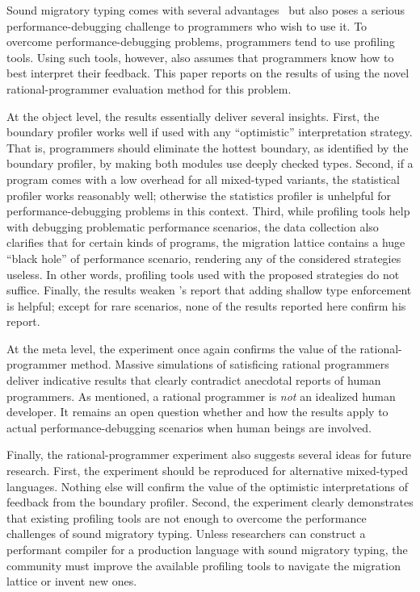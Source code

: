 

Sound migratory typing comes with several advantages~\cite{lgfd-icfp-2021,
lgfd-icfp-2023} but also poses a serious performance-debugging challenge to
programmers who wish to use it. To overcome performance-debugging problems,
programmers tend to use profiling tools. Using such tools, however, also assumes
that programmers know how to best interpret their feedback. This paper reports
on the results of using the novel rational-programmer evaluation method for this
problem.

At the object level, the results essentially deliver several insights. First,
the boundary profiler works well if used with any ``optimistic''
interpretation strategy. That is, programmers should eliminate the hottest
boundary, as identified by the boundary profiler, by making both modules
use deeply checked types. Second, if a program comes with a low overhead for all
mixed-typed variants, the statistical profiler works reasonably well;
otherwise the statistics profiler is unhelpful for performance-debugging
problems in this context. Third, while profiling tools help with debugging
problematic performance scenarios, the data collection also clarifies that for
certain kinds of programs, the migration lattice contains a huge ``black hole''
of performance scenario, rendering any of the considered strategies
useless. In other words, profiling tools used with the proposed strategies do
not suffice. Finally, the results weaken \citet{g-deep-shallow}'s report that
adding shallow type enforcement is helpful; except for rare scenarios, none of
the results reported here confirm his report.

At the meta level, the experiment once again confirms the value of the
rational-programmer method. Massive simulations of satisficing rational
programmers deliver indicative results that clearly contradict anecdotal reports
of human programmers. As mentioned, a rational programmer is {\em not\/} an
idealized human developer. It remains an open question whether and how the
results apply to actual performance-debugging scenarios when human beings are
involved.

Finally, the rational-programmer experiment also suggests several ideas for
future research. First, the experiment should be reproduced for alternative
mixed-typed languages. Nothing else will confirm the value of the optimistic
interpretations of feedback from the boundary profiler. Second, the
experiment clearly demonstrates that existing profiling tools are not enough to
overcome the performance challenges of sound migratory typing. Unless researchers
can construct a performant compiler for a production language with sound migratory 
typing, the community must improve the available profiling tools to navigate the
migration lattice or invent new ones.




